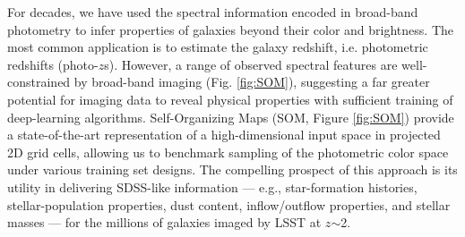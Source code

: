 For decades, we have used the spectral information encoded in
broad-band photometry to infer properties of galaxies beyond their
color and brightness. The most common application is to estimate the
galaxy redshift, i.e. photometric redshifts (photo-$z$s). However, a
range of observed spectral features are well-constrained by
broad-band imaging (Fig. \ref{fig:SOM}), suggesting a far greater
potential for imaging data to reveal physical properties with
sufficient training of deep-learning algorithms. Self-Organizing Maps
(SOM, Figure \ref{fig:SOM}) provide a state-of-the-art representation
of a high-dimensional input space in projected 2D grid cells,
allowing us to benchmark sampling of the photometric color space
under various training set designs. The compelling prospect of this
approach is its utility in delivering SDSS-like information --- e.g.,
star-formation histories, stellar-population properties, dust
content, inflow/outflow properties, and stellar masses --- for
the millions of galaxies imaged by LSST at $z$$\sim$2.





